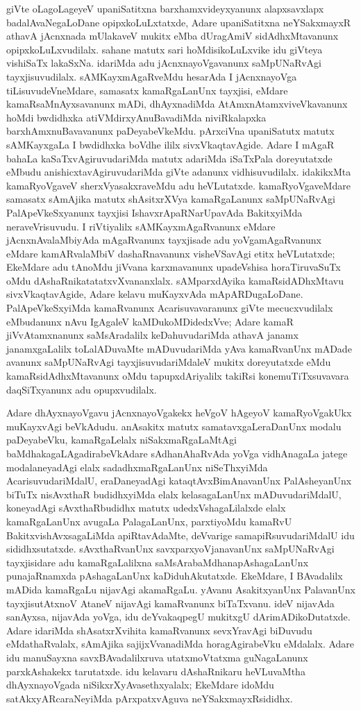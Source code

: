 giVte oLagoLageyeV upaniSatitxna barxhamxvideyxyanunx alapxsavxlapx badalAvaNe\-gaLoDane opipxkoLuLxtatxde, Adare upaniSatitxna neYSakxmayxR athavA jAcnxnada mUlakaveV mukitx eMba dUragAmiV sidAdhxMtavanunx opipxkoLuLxvudilalx. sahane matutx sari hoMdisikoLuLxvike idu giVteya vishiSaTx lakaSxNa. idariMda adu jAcnxnayoVgavanunx saMpUNaRvAgi tayxji\-suvudilalx. sAMKayxmAgaRveMdu hesarAda I jAcnxnayoVga tiLisuvudeVneMdare, samasatx kamaRgaLanUnx tayxjisi, eMdare kamaRsaMnAyxsavanunx mADi, dhAyxnadiMda AtAmxnAtamx\-viveVkavanunx hoMdi bwdidhxka atiVMdirxyAnuBavadiMda niviRkalapxka barxhAmxnuBava\-vanunx paDeyabeVkeMdu. pArxciVna upaniSatutx matutx sAMKayxgaLa I bwdidhxka boVdhe ililx sivxVkaqtavAgide. Adare I mAgaR bahaLa kaSaTxvAgiruvudariMda matutx adariMda iSaTx\-Pala doreyutatxde eMbudu anishicxtavAgiruvudariMda giVte adanunx vidhisuvudilalx. idakikxMta kamaRyoVgaveV sherxVyasakxraveMdu adu heVLutatxde. kamaRyoVgaveMdare samasatx sAmAjika matutx shAsitxrXVya kamaRgaLanunx saMpUNaRvAgi PalApeVkeSxyanunx tayxjisi IshavxrApaRNarUpavAda BakitxyiMda neraveVrisuvudu. I riVtiyalilx sAMKayx\-mAgaRvanunx eMdare jAcnxnAvalaMbiyAda mAgaRvanunx tayxjisade adu yoVga\-mAgaR\-vanunx eMdare kamARvalaMbiV dashaRnavanunx visheVSavAgi etitx heVLutatxde; EkeMdare adu tAnoMdu jiVvana karxmavanunx upadeVshisa horaTiruvaSuTx oMdu dAshaRnikatatatxvXvananxlalx. sAMparxdAyika kamaRsidADhxMtavu sivxVkaqtavAgide, Adare kelavu muKayxvAda mApARDugaLoDane. PalApeVkeSxyiMda kamaRvanunx Acarisuvavaranunx giVte mecucxvu\-dilalx eMbudanunx nAvu IgAgaleV kaMDukoMDidedxVve; Adare kamaR jiVvAtamxnanunx saMsAradalilx keDahuvudariMda athavA janamx janamxgaLalilx toLalADuvaMte mADuvuda\-riMda yAva kamaRvanUnx mADade avanunx saMpUNaRvAgi tayxjisuvudariMdaleV \hbox{mukitx} doreyutatxde eMdu kamaRsidAdhxMtavanunx oMdu tapupxdAriyalilx takiRsi kone\-muTiTxsu\-vavara daqSiTxyanunx adu opupxvudilalx.

Adare dhAyxnayoVgavu jAcnxnayoVgakekx heVgoV hAgeyoV kamaRyoVgakUkx muKayxvAgi beVkAdudu. anAsakitx matutx samatavxgaLeraDanUnx modalu paDeyabeVku, kamaRgaLelalx niSakxmaRgaLaMtAgi baMdhakagaLAgadirabeVkAdare sAdhanAhaRvAda yoVga vidhAnagaLa jatege modalaneyadAgi elalx sadadhxmaRgaLanUnx niSeThxyiMda Acarisuvu\-da\-riMdalU, eraDaneyadAgi kataqtAvxBimAnavanUnx PalAsheyanUnx biTuTx nisAvxthaR budidhx\-yiMda elalx kelasagaLanUnx mADuvudariMdalU, koneyadAgi sAvxthaRbudidhx matutx udedxVshagaLilalxde elalx kamaRgaLanUnx avugaLa PalagaLanUnx, parxtiyoMdu kamaRvU Bakitx\-vishAvxsagaLiMda apiRtavAdaMte, deVvarige samapiRsuvudariMdalU idu sididhxsutatxde. sAvxthaRvanUnx savxparxyoVjanavanUnx saMpUNaRvAgi tayxjisidare adu kamaRgaLalilxna saMsArabaMdhanapAshagaLanUnx punajaRnamxda pAshagaLanUnx kaDiduhAkutatxde. EkeMdare, I BAvadalilx mADida kamaRgaLu nijavAgi akamaRgaLu. yAvanu AsakitxyanUnx PalavanUnx tayxjisutAtxnoV AtaneV nijavAgi kamaRvanunx biTaTxvanu. ideV nijavAda sanAyxsa, nijavAda yoVga, idu deYvakaqpegU mukitxgU dArimADikoDutatxde. Adare idariMda shAsatxrXvihita kamaRvanunx sevxYravAgi biDuvudu eMdathaRvalalx, sAmAjika sajijxVvanadiMda horagAgirabeVku eMdalalx. Adare idu manuSayxna savxBAvadalilxruva utatxmoVtatxma guNagaLanunx parxkAshakekx tarutatxde. idu kelavaru dAshaRnikaru heVLuvaMtha dhAyxnayoVgada niSikxrXyAvasethxyalalx; EkeMdare idoMdu satAkxyARcaraNeyiMda pArxpatxvAguva neYSakxmayxRsididhx.

